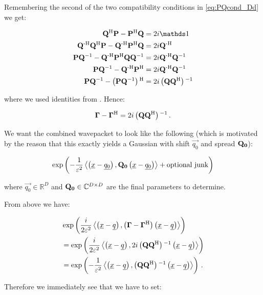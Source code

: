 Remembering the second of the two compatibility conditions in \eqref{eq:PQcond_Dd} we get:

\begin{align*}
  \mat{Q}\H \mat{P} - \mat{P}\H \mat{Q} & = 2i \id \\
  \mat{Q}\Hinv \mat{Q}\H \mat{P} - \mat{Q}\Hinv \mat{P}\H \mat{Q} & = 2i \mat{Q}\Hinv \\
  \mat{P} \mat{Q}\inv - \mat{Q}\Hinv \mat{P}\H \mat{Q} \mat{Q}\inv & = 2i \mat{Q}\Hinv \mat{Q}\inv \\
  \mat{P} \mat{Q}\inv - \mat{Q}\Hinv \mat{P}\H & = 2i \mat{Q}\Hinv \mat{Q}\inv \\
  \mat{P} \mat{Q}\inv - \left(\mat{P} \mat{Q}\inv\right)\H & = 2i \left(\mat{Q} \mat{Q}\H\right)\inv
\end{align*}

where we used identities from \cite{P_matrix_book}. Hence:

\begin{equation*}
    \mathbf{\Gamma} - \mathbf{\Gamma}{}^{\textnormal{H}} = 2i \left(\mathbf{Q} \mathbf{Q}{}^{\textnormal{H}}\right){}^{-1} \,.
\end{equation*}

We want the combined wavepacket to look like the following (which is motivated
by the reason that this exactly yields a Gaussian with shift $\vec{q_0}$ and spread $\mathbf{Q_0}$):

\begin{equation} \label{eq:desired_form}
  \exp{\left( -\frac{1}{\varepsilon^2} \ensuremath{\left\langle \left( \underline{x}-\underline{q_0} \right) ,  \mathbf{Q_0} \left( \underline{x}-\underline{q_0} \right) \right\rangle} + \text{optional junk} \right)}
\end{equation}

where $\vec{q_0} \in \mathbb{R}^D$ and $\mathbf{Q_0} \in \mathbb{C}^{D \times D}$
are the final parameters to determine.

From above we have:

\begin{align*}
  & \exp\left( \frac{i}{2\varepsilon^2} \left\langle \left( \underline{x}-\underline{q} \right) , \left(\mathbf{\Gamma} - \mathbf{\Gamma}{}^{\textnormal{H}}\right) \left( \underline{x}-\underline{q} \right) \right\rangle \right) \\
  & = \exp\left( \frac{i}{2\varepsilon^2} \left\langle \left( \underline{x}-\underline{q} \right) , 2i \left(\mathbf{Q} \mathbf{Q}{}^{\textnormal{H}}\right){}^{-1} \left( \underline{x}-\underline{q} \right) \right\rangle \right) \\
  & = \exp\left( -\frac{1}{\varepsilon^2} \left\langle \left( \underline{x}-\underline{q} \right) , \left(\mathbf{Q} \mathbf{Q}{}^{\textnormal{H}}\right){}^{-1} \left( \underline{x}-\underline{q} \right) \right\rangle \right) \,.
\end{align*}

Therefore we immediately see that we have to set:

